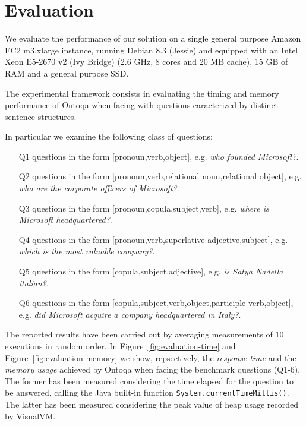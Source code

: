 \section{Evaluation}
\label{sec:evaluation}
We evaluate the performance of our solution on a single general purpose
Amazon EC2 m3.xlarge instance, running Debian 8.3 (Jessie)
and equipped with an Intel Xeon E5-2670 v2 (Ivy Bridge)  (2.6 GHz,
8 cores and 20 MB cache), 15 GB of RAM and a general purpose SSD.

The experimental framework consists in evaluating the timing and memory performance of Ontoqa when facing with questions caracterized by distinct sentence structures.

In particular we examine the following class of questions:

\begin{itemize}
	\item[Q1] questions in the form [pronoun,verb,object], e.g. \textit{who founded Microsoft?}.
	\item[Q2] questions in the form [pronoun,verb,relational noun,relational object], e.g. \textit{who are the corporate officers of Microsoft?}.
	\item[Q3] questions in the form [pronoun,copula,subject,verb], e.g. \textit{where is Microsoft headquartered?}.
	\item[Q4] questions in the form [pronoun,verb,superlative adjective,subject], e.g. \textit{which is the most valuable company?}.
	\item[Q5] questions in the form [copula,subject,adjective], e.g. \textit{is Satya Nadella italian?}.
	\item[Q6] questions in the form [copula,subject,verb,object,participle verb,object], e.g. \textit{did Microsoft acquire a company headquartered in Italy?}.
\end{itemize}

The reported results have been carried out by averaging measurements of 10 executions in random order. 
%
In Figure~\ref{fig:evaluation-time} and Figure~\ref{fig:evaluation-memory} we show, repsectively, the \textit{response time} and the \textit{memory usage} achieved by Ontoqa when facing the benchmark questions (Q1-6).
%
The former has been measured considering the time elapsed for the question to be answered, calling the Java built-in function \texttt{System.currentTimeMillis()}.
%
The latter has been measured considering the peak value of heap usage recorded by VisualVM.

